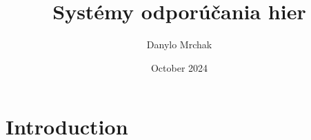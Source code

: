 \documentclass{article}
\title{Systémy odporúčania hier}
\author{Danylo Mrchak}
\date{October 2024}
\begin{document}
\maketitle

\section{Introduction}
\end{document}

